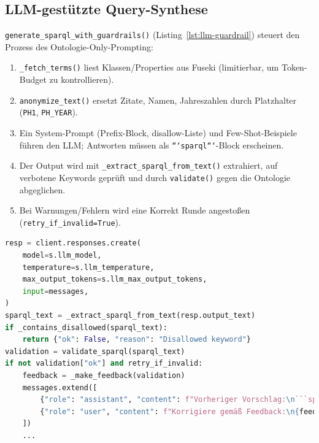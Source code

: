 \subsection{LLM-gestützte Query-Synthese}
\texttt{generate\_sparql\_with\_guardrails()} (Listing~\ref{lst:llm-guardrail}) steuert den Prozess des Ontologie-Only-Prompting:
\begin{enumerate}
  \item \texttt{\_fetch\_terms()} liest Klassen/Properties aus Fuseki (limitierbar, um Token-Budget zu kontrollieren).
  \item \texttt{anonymize\_text()} ersetzt Zitate, Namen, Jahreszahlen durch Platzhalter (\texttt{PH1}, \texttt{PH\_YEAR}).
  \item Ein System-Prompt (Prefix-Block, disallow-Liste) und Few-Shot-Beispiele führen den LLM; Antworten müssen als \texttt{```sparql```}-Block erscheinen.
  \item Der Output wird mit \texttt{\_extract\_sparql\_from\_text()} extrahiert, auf verbotene Keywords geprüft und durch \texttt{validate()} gegen die Ontologie abgeglichen.
  \item Bei Warnungen/Fehlern wird eine Korrekt Runde angestoßen (\texttt{retry\_if\_invalid=True}).
\end{enumerate}

\begin{lstlisting}[language=python,basicstyle=\ttfamily\small,caption={Guardrails im LLM-Service},label={lst:llm-guardrail}]
resp = client.responses.create(
    model=s.llm_model,
    temperature=s.llm_temperature,
    max_output_tokens=s.llm_max_output_tokens,
    input=messages,
)
sparql_text = _extract_sparql_from_text(resp.output_text)
if _contains_disallowed(sparql_text):
    return {"ok": False, "reason": "Disallowed keyword"}
validation = validate_sparql(sparql_text)
if not validation["ok"] and retry_if_invalid:
    feedback = _make_feedback(validation)
    messages.extend([
        {"role": "assistant", "content": f"Vorheriger Vorschlag:\n```sparql\n{sparql_text}\n```"},
        {"role": "user", "content": f"Korrigiere gemäß Feedback:\n{feedback}\nNur gültigen ```sparql``` Codeblock ausgeben."},
    ])
    ...
\end{lstlisting}

